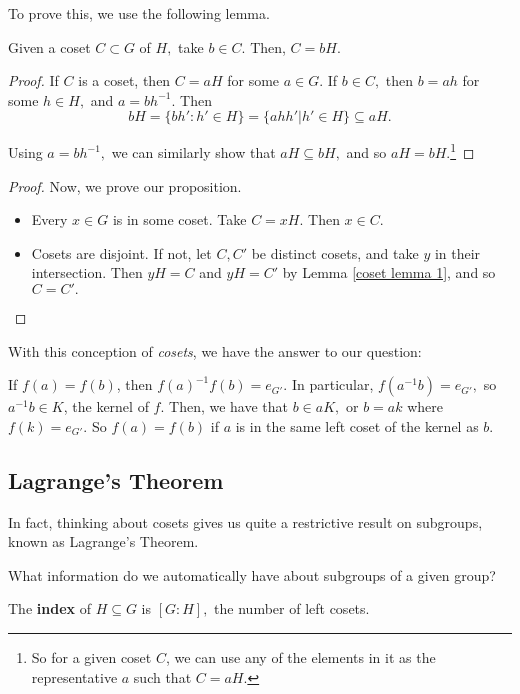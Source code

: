 To prove this, we use the following lemma.
\begin{lemma}\label{coset lemma 1}
Given a coset $C \subset G$ of $H,$ take $b \in C.$ Then, $C = bH.$

\end{lemma}
\begin{proof}
If $C$ is a coset, then $C = aH$ for some $a \in G.$ If $b \in C,$ then $b = ah$ for some $h \in H,$ and $a = bh^{-1}.$ Then 
\[
bH = \{bh' : h' \in H\} = \{ahh'| h' \in H\} \subseteq aH.
\]

Using $a = bh^{-1},$ we can similarly show that $aH \subseteq bH,$ and so $aH = bH.$\footnote{So for a given coset $C$, we can use any of the elements in it as the representative $a$ such that $C = aH.$}
\end{proof}
\begin{proof}
Now, we prove our proposition.
\begin{itemize}
    \item Every $x \in G$ is in some coset. Take $C = xH.$ Then $x \in C.$
    \item Cosets are disjoint. If not, let $C, C'$ be distinct cosets, and take $y$ in their intersection. Then $yH = C$ and $yH = C'$ by Lemma \ref{coset lemma 1}, and so $C = C'.$
\end{itemize}
\end{proof}

With this conception of \emph{cosets}, we have the answer to our question:

\begin{ans}
If $f(a) = f(b)$, then $f(a)^{-1} f(b) = e_{G'}.$ In particular, $f(a^{-1}b) = e_{G'},$ so $a^{-1}b \in K$, the kernel of $f.$ Then, we have that $b \in aK,$ or $b = ak$ where $f(k) = e_{G'}.$ So $f(a) = f(b)$ if $a$ is in the same left coset of the kernel as $b.$

\end{ans}

\subsection{Lagrange's Theorem}

In fact, thinking about cosets gives us quite a restrictive result on subgroups, known as Lagrange's Theorem.
\begin{qq}
What information do we automatically have about subgroups of a given group?
\end{qq}
\begin{definition}
The \textbf{index} of $H \subseteq G$ is $[G: H],$ the number of left cosets. 
\end{definition}

